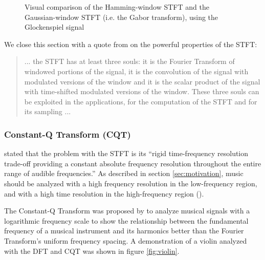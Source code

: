 \documentclass[report.tex]{subfiles}
\begin{document}
\begin{figure}[ht]
	\caption{Visual comparison of the Hamming-window STFT and the Gaussian-window STFT (i.e. the Gabor transform), using the Glockenspiel signal}
	\label{fig:stfts}
\end{figure}

We close this section with a quote from \textcite{doerflersouls} on the powerful properties of the STFT:

\begin{quote}
       ... the STFT has at least three souls: it is the Fourier Transform of windowed portions of the signal, it is the convolution of the signal with modulated versions of the window and it is the scalar product of the signal with time-shifted modulated versions of the window. These three souls can be exploited in the applications, for the computation of the STFT and for its sampling ...
\end{quote}

\newpagefill

\subsubsection{Constant-Q Transform (CQT)}
\label{sec:cqt}

\textcite{cqtransient} stated that the problem with the STFT is its ``rigid time-frequency resolution trade-off providing a constant absolute frequency resolution throughout the entire range of audible frequencies.'' As described in section \ref{sec:motivation}, music should be analyzed with a high frequency resolution in the low-frequency region, and with a high time resolution in the high-frequency region (\cite{doerflerphd, cqtransient}). 

The Constant-Q Transform was proposed by \textcite{jbrown, msp} to analyze musical signals with a logarithmic frequency scale to show the relationship between the fundamental frequency of a musical instrument and its harmonics better than the Fourier Transform's uniform frequency spacing. A demonstration of a violin analyzed with the DFT and CQT was shown in figure \ref{fig:violin}.
\end{document}
